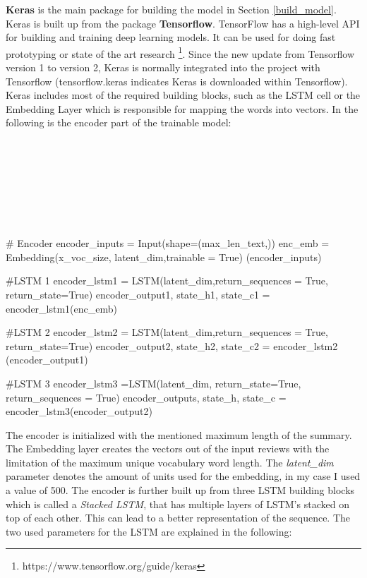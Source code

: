 \textbf{Keras} is the main package for building the model in Section \ref{build_model}. Keras is built up from the package \textbf{Tensorflow}. TensorFlow has a high-level API for building and training deep learning models. It can be used for doing fast prototyping or state of the art research \footnote{https://www.tensorflow.org/guide/keras}. Since the new update from Tensorflow version 1 to version 2, Keras is normally integrated into the project with Tensorflow (tensorflow.keras indicates Keras is downloaded within Tensorflow). Keras includes most of the required building blocks, such as the LSTM cell or the Embedding Layer which is responsible for mapping the words into vectors. In the following is the encoder part of the trainable model: \\ \\ \\ \\ \\ \\ \\ \\


\begin{python}[caption={Encoder in Python}]
# Encoder 
encoder_inputs = Input(shape=(max_len_text,)) 
enc_emb = Embedding(x_voc_size, latent_dim,trainable = True)
(encoder_inputs) 

#LSTM 1 
encoder_lstm1 = LSTM(latent_dim,return_sequences = True, return_state=True) 
encoder_output1, state_h1, state_c1 = encoder_lstm1(enc_emb) 

#LSTM 2 
encoder_lstm2 = LSTM(latent_dim,return_sequences = True, return_state=True) 
encoder_output2, state_h2, state_c2 = encoder_lstm2
(encoder_output1) 

#LSTM 3 
encoder_lstm3  =LSTM(latent_dim, return_state=True, 
return_sequences = True) 
encoder_outputs, state_h, state_c = encoder_lstm3(encoder_output2) 
\end{python}

The encoder is initialized with the mentioned maximum length of the summary. The Embedding layer creates the vectors out of the input reviews with the limitation of the maximum unique vocabulary word length. The \textit{latent\_dim} parameter denotes the amount of units used for the embedding, in my case I used a value of 500. The encoder is further built up from three LSTM building blocks which is called a \textit{Stacked LSTM}, that has multiple layers of LSTM's stacked on top of each other. This can lead to a better representation of the sequence. The two used parameters for the LSTM are explained in the following:


